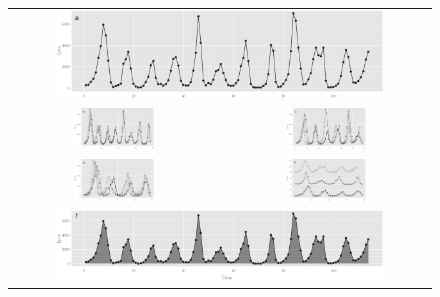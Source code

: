 \documentclass[12pt]{article}
\begin{document}
\begin{itemize}
\begin{figure}[htp]
\begin{center}
\begin{tabular}{cc}
\multicolumn{2}{c}{\includegraphics[width=0.8\textwidth]{graph/pipeline-16-original}}\\
\includegraphics[width=0.4\textwidth]{graph/pipeline-16-1} &
\includegraphics[width=0.4\textwidth]{graph/pipeline-16-2} \\
\includegraphics[width=0.4\textwidth]{graph/pipeline-16-xwrap} &
\includegraphics[width=0.4\textwidth]{graph/pipeline-16-xwrap-facet} \\
\multicolumn{2}{c}{\includegraphics[width=0.8\textwidth]{graph/pipeline-18-original}} \\

\end{tabular}
\end{center}
\end{figure}
\end{itemize}
\end{document}
